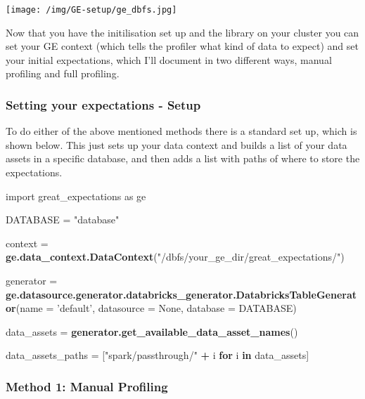 \documentclass[]{article}
\newenvironment{Shaded}{\begin{snugshade}}{\end{snugshade}}
\newcommand{\ControlFlowTok}[1]{\textcolor[rgb]{0.13,0.29,0.53}{\textbf{#1}}}
\newcommand{\DataTypeTok}[1]{\textcolor[rgb]{0.13,0.29,0.53}{#1}}
\newcommand{\KeywordTok}[1]{\textcolor[rgb]{0.13,0.29,0.53}{\textbf{#1}}}
\newcommand{\NormalTok}[1]{#1}
\newcommand{\OperatorTok}[1]{\textcolor[rgb]{0.81,0.36,0.00}{\textbf{#1}}}
\newcommand{\StringTok}[1]{\textcolor[rgb]{0.31,0.60,0.02}{#1}}
\begin{document}
\texttt{[image: /img/GE-setup/ge\_dbfs.jpg]}

Now that you have the initilisation set up and the library on your
cluster you can set your GE context (which tells the profiler what kind
of data to expect) and set your initial expectations, which I'll
document in two different ways, manual profiling and full profiling.

\hypertarget{setting-your-expectations---setup}{%
\subsubsection{Setting your expectations -
Setup}\label{setting-your-expectations---setup}}

To do either of the above mentioned methods there is a standard set up,
which is shown below. This just sets up your data context and builds a
list of your data assets in a specific database, and then adds a list
with paths of where to store the expectations.

\begin{Shaded}
\begin{Highlighting}[]
\NormalTok{import great_expectations as ge}

\NormalTok{DATABASE =}\StringTok{ "database"}

\NormalTok{context =}\StringTok{ }\KeywordTok{ge.data_context.DataContext}\NormalTok{(}\StringTok{"/dbfs/your_ge_dir/great_expectations/"}\NormalTok{)}

\NormalTok{generator =}\StringTok{ }\KeywordTok{ge.datasource.generator.databricks_generator.DatabricksTableGenerator}\NormalTok{(}\DataTypeTok{name =} \StringTok{'default'}\NormalTok{, }\DataTypeTok{datasource =}\NormalTok{ None, }\DataTypeTok{database =}\NormalTok{ DATABASE)}

\NormalTok{data_assets =}\StringTok{ }\KeywordTok{generator.get_available_data_asset_names}\NormalTok{()}

\NormalTok{data_assets_paths =}\StringTok{ }\NormalTok{[}\StringTok{"spark/passthrough/"} \OperatorTok{+}\StringTok{ }\NormalTok{i }\ControlFlowTok{for}\NormalTok{ i }\ControlFlowTok{in}\NormalTok{ data_assets]}
\end{Highlighting}
\end{Shaded}

\hypertarget{method-1-manual-profiling}{%
\subsubsection{Method 1: Manual
Profiling}\label{method-1-manual-profiling}}
\end{document}
